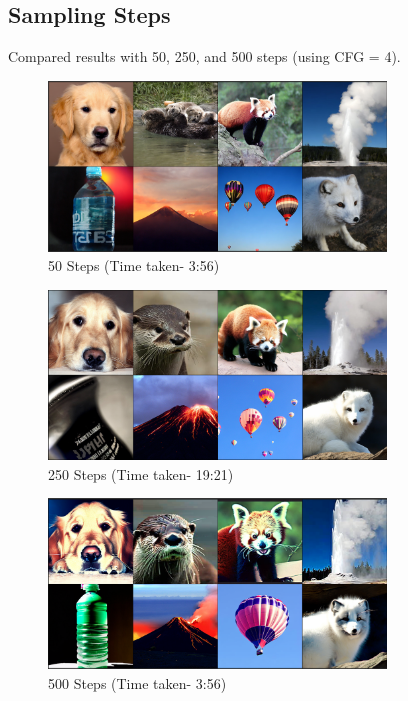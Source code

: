\documentclass{article}
\begin{document}
\subsection{Sampling Steps}
Compared results with 50, 250, and 500 steps (using CFG = 4).
\begin{figure}[h] %
    \centering
    \includegraphics[width=0.8\textwidth]{images/image-50-steps.png} %
    \caption{50 Steps (Time taken- 3:56)}
    \label{fig:cfg5} %
\end{figure}
\begin{figure}[h] %
    \centering
    \includegraphics[width=0.8\textwidth]{images/image-250-steps.png} %
    \caption{250 Steps (Time taken- 19:21)}
    \label{fig:cfg5} %
\end{figure}
\begin{figure}[] %
    \centering
    \includegraphics[width=0.8\textwidth]{images/image-500-steps.png} %
    \caption{500 Steps (Time taken- 3:56)}
    \label{fig:cfg5} %
\end{figure}
\end{document}
